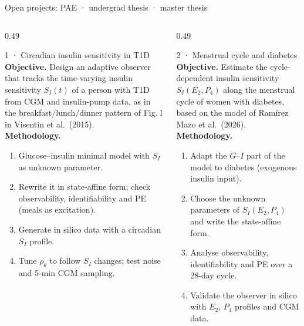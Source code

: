 \documentclass[aspectratio=169,11pt]{beamer}
\begin{document}
\begin{frame}{Open projects: PAE · undergrad thesis · master thesis}
\footnotesize
\begin{columns}[T]
\begin{column}{0.49\textwidth}
\begin{block}{1 · Circadian insulin sensitivity in T1D}\scriptsize
\textbf{Objective.} Design an adaptive observer that tracks the time-varying insulin sensitivity $S_I(t)$ of a person with T1D from CGM and insulin-pump data, as in the breakfast/lunch/dinner pattern of Fig.\,1 in Visentin et al.\ (2015).\\[4pt]
\textbf{Methodology.}\vspace{-4pt}
\begin{enumerate}\setlength\itemsep{1pt}\setlength\topsep{1pt}
  \item Glucose--insulin minimal model with $S_I$ as unknown parameter.
  \item Rewrite it in state-affine form; check observability, identifiability and PE (meals as excitation).
  \item Generate in silico data with a circadian $S_I$ profile.
  \item Tune $\rho_\theta$ to follow $S_I$ changes; test noise and 5-min CGM sampling.
\end{enumerate}
\end{block}
\end{column}
\begin{column}{0.49\textwidth}
\begin{block}{2 · Menstrual cycle and diabetes}\scriptsize
\textbf{Objective.} Estimate the cycle-dependent insulin sensitivity $S_I(E_2,P_4)$ along the menstrual cycle of women with diabetes, based on the model of Ramírez Mazo et al.\ (2026).\\[4pt]
\textbf{Methodology.}\vspace{-4pt}
\begin{enumerate}\setlength\itemsep{1pt}\setlength\topsep{1pt}
  \item Adapt the $G$--$I$ part of the model to diabetes (exogenous insulin input).
  \item Choose the unknown parameters of $S_I(E_2,P_4)$ and write the state-affine form.
  \item Analyse observability, identifiability and PE over a 28-day cycle.
  \item Validate the observer in silico with $E_2$, $P_4$ profiles and CGM data.
\end{enumerate}
\end{block}
\end{column}
\end{columns}
\end{frame}
\end{document}

